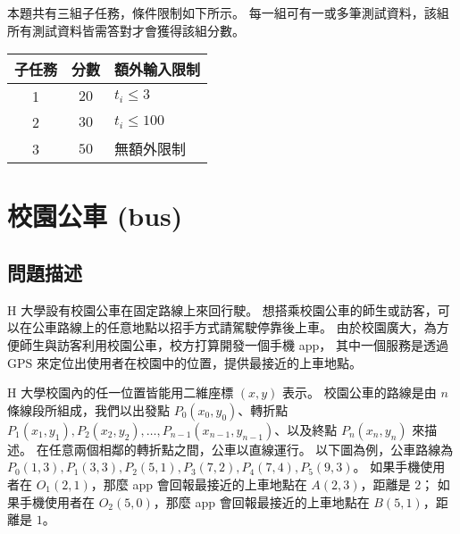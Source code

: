 本題共有三組子任務，條件限制如下所示。
每一組可有一或多筆測試資料，該組所有測試資料皆需答對才會獲得該組分數。

\begin{longtable}[]{@{}ccl@{}}
\toprule
子任務 & 分數 & 額外輸入限制 \\
\midrule
\endhead
1 & \(20\) & \begin{math}t_i \le 3\end{math} \\
2 & \(30\) & \begin{math}t_i \le 100\end{math} \\
3 & \(50\) & 無額外限制 \\
\bottomrule
\end{longtable}

\section{校園公車 (bus)}

\subsection{問題描述}

H 大學設有校園公車在固定路線上來回行駛。
想搭乘校園公車的師生或訪客，可以在公車路線上的任意地點以招手方式請駕駛停靠後上車。
由於校園廣大，為方便師生與訪客利用校園公車，校方打算開發一個手機 app，
其中一個服務是透過 GPS
來定位出使用者在校園中的位置，提供最接近的上車地點。

H 大學校園內的任一位置皆能用二維座標 \begin{math}(x, y)\end{math} 表示。
校園公車的路線是由 \begin{math}n\end{math} 條線段所組成，我們以出發點
\begin{math}P_0(x_0, y_0)\end{math}、轉折點
\begin{math}P_1(x_1, y_1), P_2(x_2, y_2), \ldots, P_{n-1}(x_{n-1}, y_{n-1})\end{math}、以及終點
\begin{math}P_n(x_n, y_n)\end{math} 來描述。
在任意兩個相鄰的轉折點之間，公車以直線運行。 以下圖為例，公車路線為
\begin{math}P_0(1, 3), P_1(3, 3), P_2(5, 1), P_3(7, 2), P_4(7, 4), P_5(9, 3)\end{math}。
如果手機使用者在 \begin{math}O_1(2, 1)\end{math}，那麼 app
會回報最接近的上車地點在 \begin{math}A(2, 3)\end{math}，距離是
\begin{math}2\end{math}； 如果手機使用者在
\begin{math}O_2(5, 0)\end{math}，那麼 app 會回報最接近的上車地點在
\begin{math}B(5, 1)\end{math}，距離是 \begin{math}1\end{math}。

